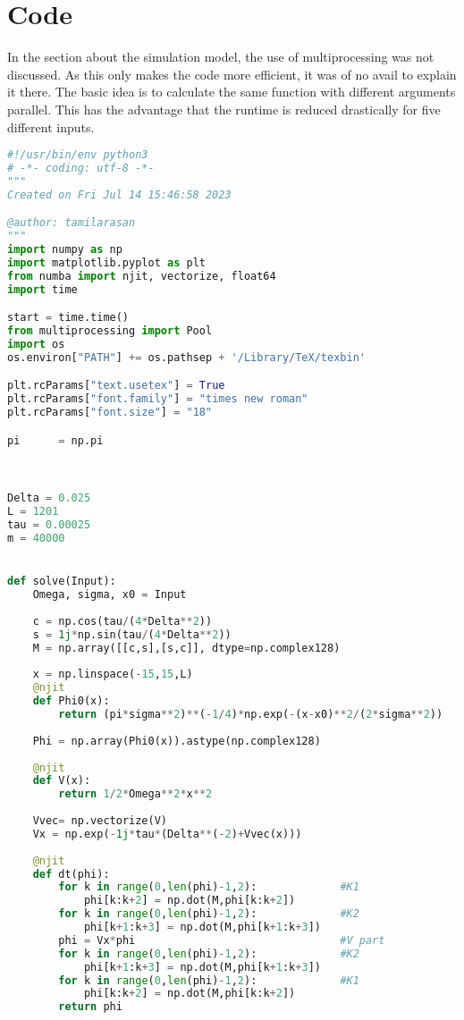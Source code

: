 \section{Code}

In the section about the simulation model, the use of multiprocessing was not discussed. As this only makes the code more efficient, it was of no avail to explain it there. The basic idea is to calculate the same function with different arguments parallel. This has the advantage that the runtime is reduced drastically for five different inputs.




\begin{lstlisting}[language=Python]
#!/usr/bin/env python3
# -*- coding: utf-8 -*-
"""
Created on Fri Jul 14 15:46:58 2023

@author: tamilarasan
"""
import numpy as np
import matplotlib.pyplot as plt
from numba import njit, vectorize, float64
import time

start = time.time()
from multiprocessing import Pool
import os 
os.environ["PATH"] += os.pathsep + '/Library/TeX/texbin'

plt.rcParams["text.usetex"] = True
plt.rcParams["font.family"] = "times new roman"
plt.rcParams["font.size"] = "18"

pi      = np.pi  



Delta = 0.025
L = 1201
tau = 0.00025
m = 40000


def solve(Input): 
    Omega, sigma, x0 = Input
    
    c = np.cos(tau/(4*Delta**2))
    s = 1j*np.sin(tau/(4*Delta**2))
    M = np.array([[c,s],[s,c]], dtype=np.complex128) 
    
    x = np.linspace(-15,15,L)
    @njit
    def Phi0(x):
        return (pi*sigma**2)**(-1/4)*np.exp(-(x-x0)**2/(2*sigma**2))
    
    Phi = np.array(Phi0(x)).astype(np.complex128) 
    
    @njit
    def V(x):
        return 1/2*Omega**2*x**2
    
    Vvec= np.vectorize(V)    
    Vx = np.exp(-1j*tau*(Delta**(-2)+Vvec(x)))
    
    @njit
    def dt(phi):
        for k in range(0,len(phi)-1,2):             #K1
            phi[k:k+2] = np.dot(M,phi[k:k+2])
        for k in range(0,len(phi)-1,2):             #K2
            phi[k+1:k+3] = np.dot(M,phi[k+1:k+3])
        phi = Vx*phi                                #V part
        for k in range(0,len(phi)-1,2):             #K2
            phi[k+1:k+3] = np.dot(M,phi[k+1:k+3])
        for k in range(0,len(phi)-1,2):             #K1
            phi[k:k+2] = np.dot(M,phi[k:k+2])
        return phi
    

\end{lstlisting}

